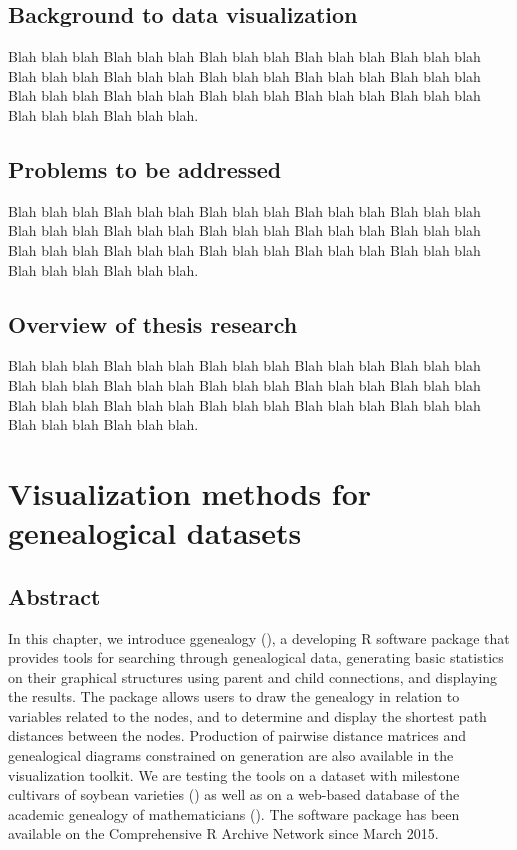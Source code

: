 \documentclass[11pt,a4paper,oldfontcommands,openany]{memoir}
\numberwithin{equation}{section} %
\begin{document}
\section{Background to data visualization}

Blah blah blah Blah blah blah Blah blah blah Blah blah blah Blah blah blah Blah blah blah Blah blah blah Blah blah blah Blah blah blah Blah blah blah Blah blah blah Blah blah blah Blah blah blah Blah blah blah Blah blah blah Blah blah blah Blah blah blah.

\section{Problems to be addressed}

Blah blah blah Blah blah blah Blah blah blah Blah blah blah Blah blah blah Blah blah blah Blah blah blah Blah blah blah Blah blah blah Blah blah blah Blah blah blah Blah blah blah Blah blah blah Blah blah blah Blah blah blah Blah blah blah Blah blah blah.

\section{Overview of thesis research}
\label{sec:helpSection}

Blah blah blah Blah blah blah Blah blah blah Blah blah blah Blah blah blah Blah blah blah Blah blah blah Blah blah blah Blah blah blah Blah blah blah Blah blah blah Blah blah blah Blah blah blah Blah blah blah Blah blah blah Blah blah blah Blah blah blah.

\chapter{Visualization methods for genealogical datasets}
\label{sec:ggenealogy}

\section{Abstract}

In this chapter, we introduce ggenealogy (\citealt{ggen}), a developing R software package that provides tools for searching through genealogical data, generating basic statistics on their graphical structures using parent and child connections, and displaying the results. The package allows users to draw the genealogy in relation to variables related to the nodes, and to determine and display the shortest path distances between the nodes. Production of pairwise distance matrices and genealogical diagrams constrained on generation are also available in the visualization toolkit. We are testing the tools on a dataset with milestone cultivars of soybean varieties (\citealt{soybean}) as well as on a web-based database of the academic genealogy of mathematicians (\citealt{mgp}). 
The software package has been available on the Comprehensive R Archive Network since March 2015. 
\end{document}
